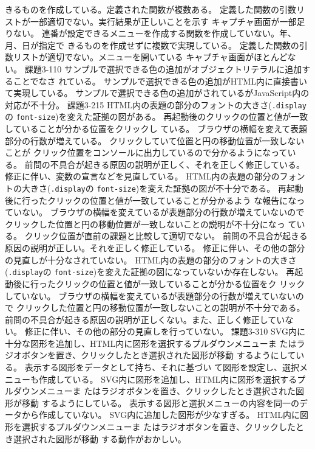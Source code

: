 \documentclass[a4j]{jreport}
\begin{document}
{{{   きるものを作成している。定義された関数が複数ある。\ResultA}
   {定義した関数の引数リストが一部適切でない。実行結果が正しいことを示す
   キャプチャ画面が一部足りない。\ResultA}
 }
 {
   {連番が設定できるメニューを作成する関数を作成していない。年、月、日が指定で
   きるものを作成せずに複数で実現している。\ResultA}
   {定義した関数の引数リストが適切でない。メニューを開いている
   キャプチャ画面がほとんどない。\ResultA}
 }
 {課題3-1}{10}{
 {サンプルで選択できる色の追加がオブジェクトリテラルに追加することでなさ
 れている。\ResultA}
 }
 {
 {サンプルで選択できる色の追加がHTML内に直接書いて実現している。\ResultA}
 }
 {
 {サンプルで選択できる色の追加がされているがJavaScript内の対応が不十分。\ResultA}
 }
 {課題3-2}{15}
 {
 {HTML内の表題の部分のフォントの大きさ(\texttt{.display}の
    \texttt{font-size})を変えた証拠の図がある。\ResultA}
 {再起動後のクリックの位置と値が一致していることが分かる位置をクリックし
 ている。\ResultEFI}
 {ブラウザの横幅を変えて表題部分の行数が増えている。\ResultEFI}
 {クリックしていて位置と円の移動位置が一致しないことが
  クリック位置をコンソールに出力しているので分かるようになっている。\ResultEFI}
 {前問の不具合が起きる原因の説明が正しく、それを正しく修正している。\ResultA}
 {修正に伴い、変数の宣言などを見直している。\ResultA}
 }
 {
  {HTML内の表題の部分のフォントの大きさ(\texttt{.display}の
   \texttt{font-size})を変えた証拠の図が不十分である。\ResultA}
  {再起動後に行ったクリックの位置と値が一致していることが分かるよう
        な報告になっていない。\ResultEFI}
  {ブラウザの横幅を変えているが表題部分の行数が増えていないので
   クリックした位置と円の移動位置が一致しないことの説明が不十分になっ
   ている。\ResultEFI}
 {クリック位置が直前の課題と比較して適切でない。\ResultEFI}
   {前問の不具合が起きる原因の説明が正しい。それを正しく修正している。\ResultA}
   {修正に伴い、その他の部分の見直しが十分なされていない。\ResultA}
}
 {
 {HTML内の表題の部分のフォントの大きさ(\texttt{.display}の
  \texttt{font-size})を変えた証拠の図になっていないか存在しない。\ResultEFI}
 {再起動後に行ったクリックの位置と値が一致していることが分かる位置をク
        リックしていない。\ResultEFI}
  {ブラウザの横幅を変えているが表題部分の行数が増えていないので
     クリックした位置と円の移動位置が一致しないことの説明が不十分である。\ResultEFI}
  {前問の不具合が起きる原因の説明が正しくない。また、正しく修正していな
   い。\ResultA}
 {修正に伴い、その他の部分の見直しを行っていない。\ResultA}
}
{課題3-3}{10}
{
 {SVG内に十分な図形を追加し、HTML内に図形を選択するプルダウンメニューま
  たはラジオボタンを置き、クリックしたとき選択された図形が移動
  するようにしている。\ResultA}
  {表示する図形をデータとして持ち、それに基づい
   て図形を設定し、選択メニューも作成している。\ResultA}
 }
 {
   {SVG内に図形を追加し、HTML内に図形を選択するプルダウンメニューま
    たはラジオボタンを置き、クリックしたとき選択された図形が移動
    するようにしている。\ResultA}
   {表示する図形と選択メニューの内容を同一のデータから作成していない。\ResultA}
}
{
 {SVG内に追加した図形が少なすぎる。\ResultA}
 {HTML内に図形を選択するプルダウンメニューま
  たはラジオボタンを置き、クリックしたとき選択された図形が移動
  する動作がおかしい。\ResultA}
 }
}
\end{document}
